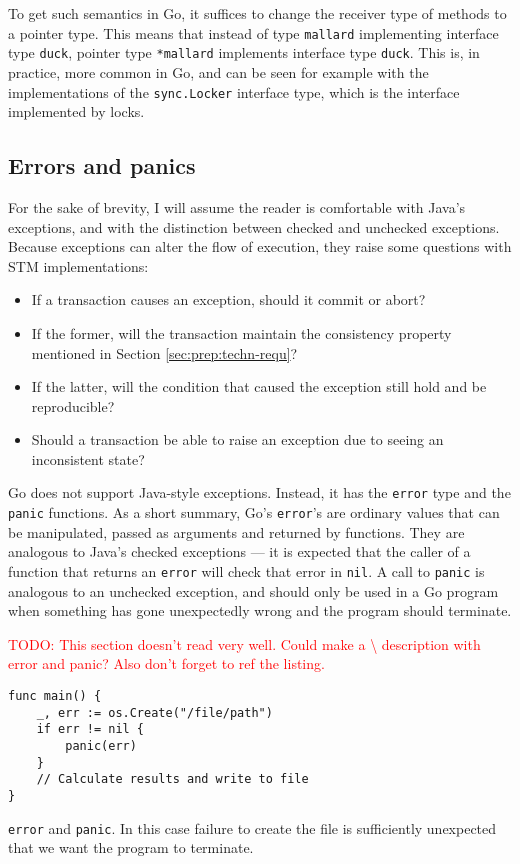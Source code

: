 \documentclass[12pt,a4paper,oneside,openright]{report}
\newcommand{\mycaption}[2]{\caption[#1]{#1 #2}}
\newcommand{\todo}[1]{\textcolor{red}{TODO: #1}}
\newcommand{\goType}[1]{\texttt{#1}}
\newcommand{\goValue}[1]{\texttt{#1}}
\newcommand{\goFunc}[1]{\texttt{#1}}
\begin{document}
To get such semantics in Go, it suffices to change the receiver type
of methods to a pointer type. This means that instead of type
\goType{mallard} implementing interface type \goType{duck}, pointer
type \goType{*mallard} implements interface type \goType{duck}. This
is, in practice, more common in Go, and can be seen for example with
the implementations of the \goType{sync.Locker} interface type, which
is the interface implemented by locks.

\subsection{Errors and panics}
\label{sec:prep:panics-errors}

For the sake of brevity, I will assume the reader is comfortable with
Java's exceptions, and with the distinction between checked and
unchecked exceptions. Because exceptions can alter the flow of
execution, they raise some questions with STM implementations:

\begin{itemize}
\item If a transaction causes an exception, should it commit or abort?
\item If the former, will the transaction maintain the consistency
  property mentioned in Section \ref{sec:prep:techn-requ}?
\item If the latter, will the condition that caused the exception
  still hold and be reproducible?
\item Should a transaction be able to raise an exception due to seeing
  an inconsistent state?
\end{itemize}

Go does not support Java-style exceptions. Instead, it has the
\goType{error} type and the \goFunc{panic} functions. As a short
summary, Go's \goType{error}'s are ordinary values that can be
manipulated, passed as arguments and returned by functions. They are
analogous to Java's checked exceptions --- it is expected that the
caller of a function that returns an \goType{error} will check that
error in \goValue{nil}. A call to \goFunc{panic} is analogous to an
unchecked exception, and should only be used in a Go program when
something has gone unexpectedly wrong and the program should
terminate.

\todo{This section doesn't read very well. Could make a \textbackslash
  description with error and panic? Also don't forget to ref the
  listing.}

\begin{Listing}[hbtp]
\begin{lstlisting}
func main() {
    _, err := os.Create("/file/path")
    if err != nil {
        panic(err)
    }
    // Calculate results and write to file
}
\end{lstlisting}

  \mycaption{\goType{error} and \goFunc{panic}.}{In this case failure
    to create the file is sufficiently unexpected that we want the
    program to terminate.}
  \label{lst:interfaceTypes}
\end{Listing}
\end{document}
